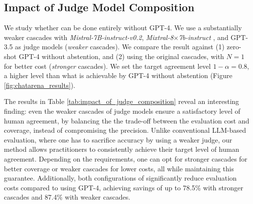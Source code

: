 \subsection{Impact of Judge Model Composition} We study whether \method can be done entirely without GPT-4. We use a substantially weaker cascades with \textit{Mistral-7B-instruct-v0.2}, \textit{Mixtral-8$\times$7b-instruct} \citep{mixtral}, and GPT-3.5 as judge models (\textit{weaker} cascades). We compare the result against (1) zero-shot GPT-4 without abstention, and (2) \method using the original cascades, with $N = 1$ for better cost (\textit{stronger} cascades). We set the target agreement level $1 - \alpha = 0.8$, a higher level than what is achievable by GPT-4 without abstention (Figure \ref{fig:chatarena_results}). 

The results in Table \ref{tab:impact_of_judge_composition} reveal an interesting finding: even the weaker cascades of judge models ensure a satisfactory level of human agreement, by balancing the the trade-off between the evaluation cost and coverage, instead of compromising the precision. Unlike conventional LLM-based evaluation, where one has to sacrifice accuracy by using a weaker judge, our method allows practitioners to consistently achieve their target level of human agreement. Depending on the requirements, one can opt for stronger cascades for better coverage or weaker cascades for lower costs, all while maintaining this guarantee. Additionally, both configurations of \method significantly reduce evaluation costs compared to using GPT-4, achieving savings of up to 78.5\% with stronger cascades and 87.4\% with weaker cascades.

